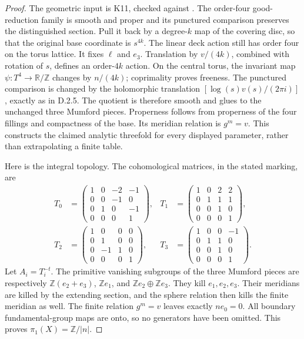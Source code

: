 \begin{proof}
The geometric input is K11, checked against
\cite[Proposition 3.1, Lemma 3.2, Proposition 4.2]{manViaclovskyTwo26}.
The order-four good-reduction family is smooth and proper and its
punctured comparison preserves the distinguished section.
Pull it back by a degree-$k$ map of the covering disc, so that the
original base coordinate is $s^{4k}$. The linear deck action still
has order four on the torus lattice. It fixes $\ell$ and $e_3$.
Translation by $v/(4k)$, combined with rotation of $s$, defines
an order-$4k$ action. On the central torus, the invariant map
$\psi:T^4\to\mathbb R/\mathbb Z$ changes by $n/(4k)$;
coprimality proves freeness. The punctured comparison is changed
by the holomorphic translation
$[\log(s)v(s)/(2\pi i)]$, exactly as in D.2.5.
The quotient is therefore smooth and glues to the unchanged
three Mumford pieces. Properness follows from properness of the
four fillings and compactness of the base. Its meridian relation
is $g^m=v$. This constructs the claimed analytic threefold for
every displayed parameter, rather than extrapolating a finite table.

Here is the integral topology. The cohomological matrices, in the
stated marking, are
\[
 \begin{aligned}
 T_0&=\begin{pmatrix}1&0&-2&-1\\0&0&-1&0\\0&1&0&-1\\0&0&0&1\end{pmatrix},
 &T_1&=\begin{pmatrix}1&0&2&2\\0&1&1&1\\0&0&1&0\\0&0&0&1\end{pmatrix},\\
 T_2&=\begin{pmatrix}1&0&0&0\\0&1&0&0\\0&-1&1&0\\0&0&0&1\end{pmatrix},
 &T_3&=\begin{pmatrix}1&0&0&-1\\0&1&1&0\\0&0&1&0\\0&0&0&1\end{pmatrix}.
 \end{aligned}
\]
Let $A_i=T_i^{-t}$. The primitive vanishing subgroups of the
three Mumford pieces are respectively
$\mathbb Z(e_2+e_3)$, $\mathbb Ze_1$, and
$\mathbb Ze_2\oplus\mathbb Ze_3$.
They kill $e_1,e_2,e_3$. Their meridians are killed by the
extending section, and the sphere relation then kills the finite
meridian as well. The finite relation $g^m=v$ leaves exactly
$ne_0=0$. All boundary fundamental-group maps are onto, so
no generators have been omitted. This proves $\pi_1(X)=\mathbb Z/|n|$.


\end{proof}
